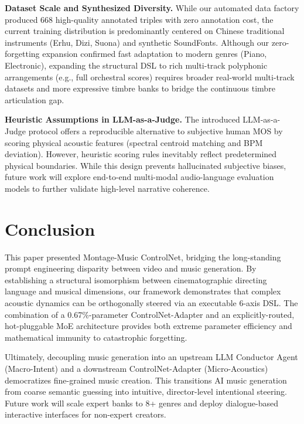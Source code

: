\documentclass[conference]{IEEEtran}
\begin{document}
\textbf{Dataset Scale and Synthesized Diversity.} While our automated data factory produced 668 high-quality annotated triples with zero annotation cost, the current training distribution is predominantly centered on Chinese traditional instruments (Erhu, Dizi, Suona) and synthetic SoundFonts. Although our zero-forgetting expansion confirmed fast adaptation to modern genres (Piano, Electronic), expanding the structural DSL to rich multi-track polyphonic arrangements (e.g., full orchestral scores) requires broader real-world multi-track datasets and more expressive timbre banks to bridge the continuous timbre articulation gap.

\textbf{Heuristic Assumptions in LLM-as-a-Judge.} The introduced LLM-as-a-Judge protocol offers a reproducible alternative to subjective human MOS by scoring physical acoustic features (spectral centroid matching and BPM deviation). However, heuristic scoring rules inevitably reflect predetermined physical boundaries. While this design prevents hallucinated subjective biases, future work will explore end-to-end multi-modal audio-language evaluation models to further validate high-level narrative coherence.

\section{Conclusion}

This paper presented Montage-Music ControlNet, bridging the long-standing prompt engineering disparity between video and music generation. By establishing a structural isomorphism between cinematographic directing language and musical dimensions, our framework demonstrates that complex acoustic dynamics can be orthogonally steered via an executable 6-axis DSL. The combination of a 0.67\%-parameter ControlNet-Adapter and an explicitly-routed, hot-pluggable MoE architecture provides both extreme parameter efficiency and mathematical immunity to catastrophic forgetting. 

Ultimately, decoupling music generation into an upstream LLM Conductor Agent (Macro-Intent) and a downstream ControlNet-Adapter (Micro-Acoustics) democratizes fine-grained music creation. This transitions AI music generation from coarse semantic guessing into intuitive, director-level intentional steering. Future work will scale expert banks to 8+ genres and deploy dialogue-based interactive interfaces for non-expert creators.
\end{document}
